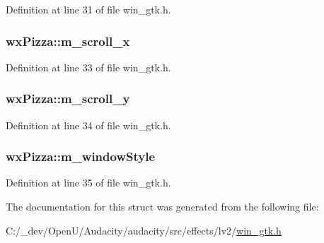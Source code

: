 Definition at line 31 of file win\+\_\+gtk.\+h.

\subsubsection[{\texorpdfstring{m\+\_\+scroll\+\_\+x}{m_scroll_x}}]{ wx\+Pizza\+::m\+\_\+scroll\+\_\+x}\hypertarget{structwx_pizza_a7db041d5b671dce52cab76769b01729c}{}\label{structwx_pizza_a7db041d5b671dce52cab76769b01729c}


Definition at line 33 of file win\+\_\+gtk.\+h.

\subsubsection[{\texorpdfstring{m\+\_\+scroll\+\_\+y}{m_scroll_y}}]{ wx\+Pizza\+::m\+\_\+scroll\+\_\+y}\hypertarget{structwx_pizza_ad702b47c50c11f426c7f4eadd891475a}{}\label{structwx_pizza_ad702b47c50c11f426c7f4eadd891475a}


Definition at line 34 of file win\+\_\+gtk.\+h.

\subsubsection[{\texorpdfstring{m\+\_\+window\+Style}{m_windowStyle}}]{ wx\+Pizza\+::m\+\_\+window\+Style}\hypertarget{structwx_pizza_ac6d59a398b2c3e5024939a0325b1ca38}{}\label{structwx_pizza_ac6d59a398b2c3e5024939a0325b1ca38}


Definition at line 35 of file win\+\_\+gtk.\+h.



The documentation for this struct was generated from the following file\+:\begin{DoxyCompactItemize}
\item 
C\+:/\+\_\+dev/\+Open\+U/\+Audacity/audacity/src/effects/lv2/\hyperlink{win__gtk_8h}{win\+\_\+gtk.\+h}\end{DoxyCompactItemize}
